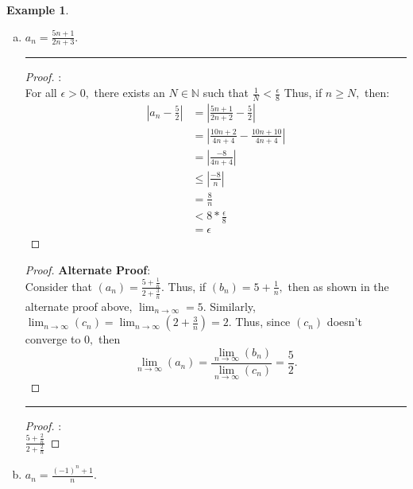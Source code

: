 \documentclass[openany, amssymb, psamsfonts]{amsart}
\newcommand{\bbN}{\mathbb{N}}
\theoremstyle{definition}
\newtheorem{exmp}{Example}[section]
\numberwithin{equation}{section}
\begin{document}
\begin{exmp}
\begin{enumerate}[(a)]
			\item $a_n=\frac{5n+1}{2n+3}$.
\vspace{4pt}     \hrule   \vspace{4pt} \begin{proof}:\\
For all $\epsilon>0,$ there exists an $N \in \bbN$ such that $\frac{1}{N}<\frac{\epsilon}{8}$ Thus, if $n\geq N,$ then:
\begin{align*}
|a_n - \frac{5}{2}| &= |\frac{5n+1}{2n+2}- \frac{5}{2}|\\
&=|\frac{10n+2}{4n+4}- \frac{10n+10}{4n+4}|\\
&= |\frac{-8}{4n+4}|\\
&\leq |\frac{-8}{n}|\\
&= \frac{8}{n}\\
&< 8 * \frac{\epsilon}{8}\\
&= \epsilon
\end{align*}
\end{proof}
\begin{proof}\textbf{Alternate Proof}:\\
    Consider that $(a_n) = \frac{5 + \frac{1}{n}}{2 + \frac{3}{n}}.$ Thus, if $(b_n) = 5 + \frac{1}{n},$ then as shown in the alternate proof above, $\displaystyle\lim_{n\to \infty} = 5.$ Similarly, $\displaystyle\lim_{n\to \infty}(c_n) = \displaystyle\lim_{n\to\infty}(2 + \frac{3}{n}) =2.$ Thus, since $(c_n)$ doesn't converge to $0,$ then \[\lim_{n\to \infty}(a_n) = \frac{\lim_{n\to \infty}(b_n)}{\lim_{n\to \infty}(c_n)} = \frac{5}{2}.\]
\end{proof}\vspace{4pt}     \hrule   \vspace{4pt}
\begin{proof}:\\
$\frac{5 + \frac{2}{n}}{2 + \frac{2}{n}}$
\end{proof}
			\item $a_n=\frac{(-1)^n+1}{n}$.
		\end{enumerate}
\end{exmp}
\end{document}
